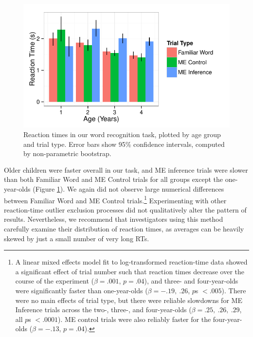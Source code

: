 \documentclass[man,noapacite]{apa2}
\begin{document}
\begin{figure}[t] 
  \begin{center} 
    \includegraphics[width=5in]{figures/rt.pdf} 
    \caption{\label{fig:rt} Reaction times in our word recognition task, plotted by age group and trial type. Error bars show 95\% confidence intervals, computed by non-parametric bootstrap.}
  \end{center} 
\end{figure}

Older children were faster overall in our task, and ME inference trials were slower than both Familiar Word and ME Control trials for all groups except the one-year-olds (Figure \ref{fig:rt}). We again did not observe large numerical differences between Familiar Word and ME Control trials.\footnote{A linear mixed effects model fit to log-transformed reaction-time data showed a significant effect of trial number such that reaction times decrease over the course of the experiment ($\beta = .001$, $p = .04$), and three- and four-year-olds were significantly faster than one-year-olds ($\beta = -.19,~.26$, $p$s $<.005$). There were no main effects of trial type, but there were reliable slowdowns for ME Inference trials across the two-, three-, and four-year-olds ($\beta=.25,~.26,~.29$, all $p$s $< .0001$). ME control trials were also reliably faster for the four-year-olds ($\beta=-.13$, $p=.04$).} Experimenting with other reaction-time outlier exclusion processes did not qualitatively alter the pattern of results. Nevertheless, we recommend that investigators using this method carefully examine their distribution of reaction times, as averages can be heavily skewed by just a small number of very long RTs.
\end{document}
